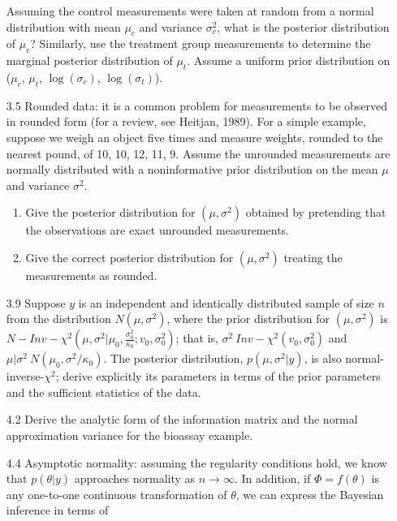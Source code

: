\documentclass[12pt,a4paper,twoside]{article}
\begin{document}
\begin{enumerate}
    Assuming the control measurements were taken at random from a normal distribution with mean $\mu_c$ and variance $\sigma^{2}_{c}$,
    what is the posterior distribution of $\mu_c$? Similarly, use the treatment group measurements to determine the marginal posterior
    distribution of $\mu_t$. Assume a uniform prior distribution on ($\mu_c$, $\mu_t$, $\log(\sigma_c)$, $\log(\sigma_t)$)\cite{Chapter3Exercises}.
    \item[3.5] Rounded data: it is a common problem for measurements to be observed in rounded form (for a review, see Heitjan, 1989).
    For a simple example, suppose we weigh an object five times and measure weights, rounded to the nearest pound, of 10, 10, 12, 11,
    9. Assume the unrounded measurements are normally distributed with a noninformative prior distribution on the mean $\mu$ and
    variance $\sigma^2$\cite{Chapter3Exercises}.
    \begin{enumerate}[label=$(\alph*)$]
        \item Give the posterior distribution for $(\mu, \sigma^2)$ obtained by pretending that the observations are exact unrounded
        measurements.
        \item Give the correct posterior distribution for $(\mu, \sigma^2)$ treating the measurements as rounded.
    \end{enumerate}
    \item[3.9] Suppose $y$ is an independent and identically distributed sample of size $n$ from the distribution $N(\mu, \sigma^2)$, where the
    prior distribution for $(\mu, \sigma^2)$ is $N-Inv-\chi^2(\mu, \sigma^2|\mu_0, \frac{\sigma^2_0}{\kappa_0}; v_0, \sigma^{2}_{0})$; that is,
    $\sigma^2 ~ Inv-\chi^2(v_0, \sigma^2_0)$ and $\mu|\sigma^2 ~ N(\mu_0, \sigma^2/\kappa_ 0)$. The posterior distribution, $p(\mu, \sigma^2|y)$,
    is also normal-inverse-$\chi^2$; derive explicitly its parameters in terms of the prior parameters and the sufficient statistics of the
    data\cite{Chapter3Exercises}.
    \item[4.2] Derive the analytic form of the information matrix and the normal approximation variance for the bioassay
    example\cite{BioassayExample}\cite{Chapter4Exercises}.
    \item[4.4] Asymptotic normality: assuming the regularity conditions hold, we know that $p(\theta|y)$ approaches normality as $n \rightarrow \infty$.
    In addition, if $\Phi = f(\theta)$ is any one-to-one continuous transformation of $\theta$, we can express the Bayesian inference in terms of

\end{enumerate}
\end{document}
